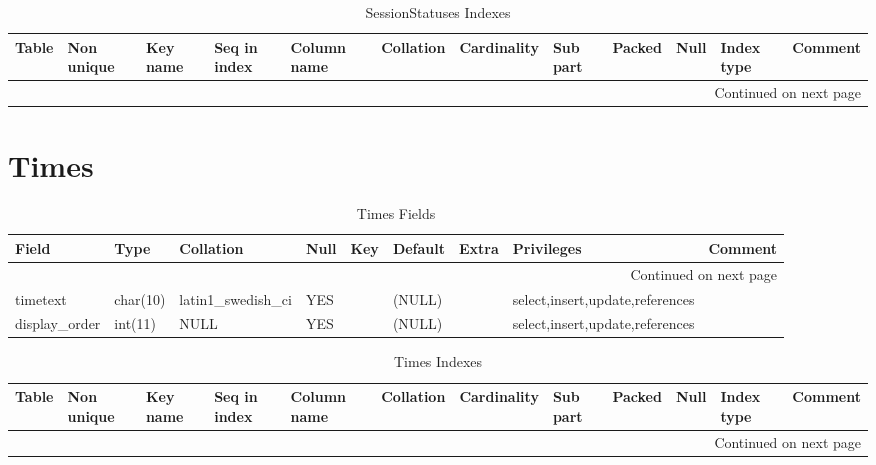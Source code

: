 \documentclass[tablesignature,landscape]{scrartcl}
\begin{document}
\begin{longtable}{|l|l|l|l|l|l|l|l|l|l|l|l|}
\caption{SessionStatuses Indexes} \label{tbl:sessionstatusesindexes}\\
\hline
 Table            &  Non unique  &  Key name  &  Seq in index  &  Column name  &  Collation  &  Cardinality  &  Sub part  &  Packed  &  Null  &  Index type  &  Comment \\
\hline
\endhead
\hline\multicolumn{12}{r}{Continued on next page}\
\endfoot
\endlastfoot
\hline
 SessionStatuses  &           0  &  PRIMARY   &             1  &  statusid     &  A          &            7  &  (NULL)    &  (NULL)  &        &  BTREE       &           \\
\hline
\end{longtable}
\section{Times}
\label{sec-31}


\begin{longtable}{|l|l|l|l|l|l|l|l|l|}
\caption{Times Fields} \label{tbl:timessfields}\\
\hline
 Field             &  Type      &  Collation                &  Null  &  Key  &  Default  &  Extra  &  Privileges                       &  Comment \\
\hline
\endhead
\hline\multicolumn{9}{r}{Continued on next page}\
\endfoot
\endlastfoot
\hline
 timeindex         &  int(11)   &  NULL                     &        &  PRI  &  0        &         &  select,insert,update,references  &           \\
 timetext          &  char(10)  &  latin1\_{}swedish\_{}ci  &  YES   &       &  (NULL)   &         &  select,insert,update,references  &           \\
 display\_{}order  &  int(11)   &  NULL                     &  YES   &       &  (NULL)   &         &  select,insert,update,references  &           \\
\hline
\end{longtable}


\begin{longtable}{|l|l|l|l|l|l|l|l|l|l|l|l|}
\caption{Times Indexes} \label{tbl:timesindexes}\\
\hline
 Table  &  Non unique  &  Key name  &  Seq in index  &  Column name  &  Collation  &  Cardinality  &  Sub part  &  Packed  &  Null  &  Index type  &  Comment \\
\hline
\endhead
\hline\multicolumn{12}{r}{Continued on next page}\
\endfoot
\endlastfoot
\hline
 Times  &           0  &  PRIMARY   &             1  &  timeindex    &  A          &           24  &  (NULL)    &  (NULL)  &        &  BTREE       &           \\
\hline
\end{longtable}
\end{document}
